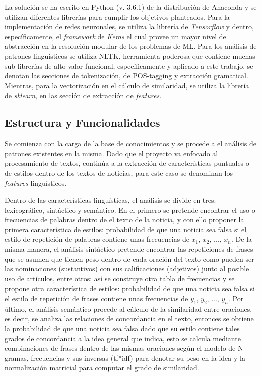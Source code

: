 \documentclass{llncs}
\begin{document}
\begin{multicols}{2}[]
La soluci\'on se ha escrito en Python (v. 3.6.1) de la distribuci\'on de Anaconda y se utilizan diferentes librer\'ias para cumplir los objetivos planteados. Para la implementaci\'on de redes
neuronales, se utiliza la librer\'ia de \textit{Tensorflow} y dentro, espec\'ificamente, el \textit{framework} de \textit{Keras} el cual provee un mayor nivel de abstracci\'on en la resoluci\'on
modular de los problemas de ML. Para los an\'alisis de patrones lingu\'isticos se utiliza NLTK, herramienta poderosa que contiene muchas sub-librer\'ias de alto valor funcional,
espec\'ificamente y aplicado a este trabajo, se denotan las secciones de tokenizaci\'on, de POS-tagging y extracci\'on gramatical. Mientras, para la vectorizaci\'on en el c\'alculo de
similaridad, se utiliza la librer\'ia de \textit{sklearn}, en las secci\'on de extracci\'on de \textit{features}.

\subsection{Estructura y Funcionalidades}

Se comienza con la carga de la base de conocimientos y se procede a el an\'alisis de patrones existentes en la misma. Dado que el proyecto va enfocado al procesamiento de textos,
contin\'ua a la extracci\'on de caracter\'isticas puntuales o de estilos dentro de los textos de noticias, para este caso se denominan los \textit{features} lingu\'isticos.

Dentro de las caracter\'isticas lingu\'isticas, el an\'alisis se divide en tres: lexicogr\'afico, sint\'actico y sem\'antico. En el primero se pretende encontrar el uso o frecuencias de palabras
dentro de el texto de la noticia, y con ello proponer la primera caracter\'istica de estilos: probabilidad de que una noticia sea falsa si el estilo de repetici\'on de palabras contiene unas
frecuencias de $x_1$, $x_2$, ..., $x_n$. De la misma manera, el an\'alisis sint\'actico pretende encontrar las repeticiones de frases que se asumen que tienen peso dentro de cada
oraci\'on del texto como pueden ser las nominaciones (sustantivos) con sus calificaciones (adjetivos) junto al posible uso de art\'iculos, entre otros; as\'i se construye otra tabla de
frecuencias y se propone otra caracter\'istica de estilos: probabilidad de que una noticia sea falsa si el estilo de repetici\'on de frases contiene unas frecuencias de $y_1$, $y_2$, ...,
$y_n$. Por \'ultimo, el an\'alisis sem\'antico procede al c\'alculo de la similaridad entre oraciones, es decir, se analiza las relaciones de concordancia en el texto, entonces se obtiene
la probabilidad de que una noticia sea falsa dado que su estilo contiene tales grados de concordancia a la idea general que indica, esto se calcula mediante combinaciones de frases
dentro de las mismas oraciones seg\'un el modelo de N-gramas, frecuencias y sus inversas (tf*idf) para denotar su peso en la idea y la normalizaci\'on matricial para computar el grado 
de similaridad.


\end{multicols}
\end{document}
